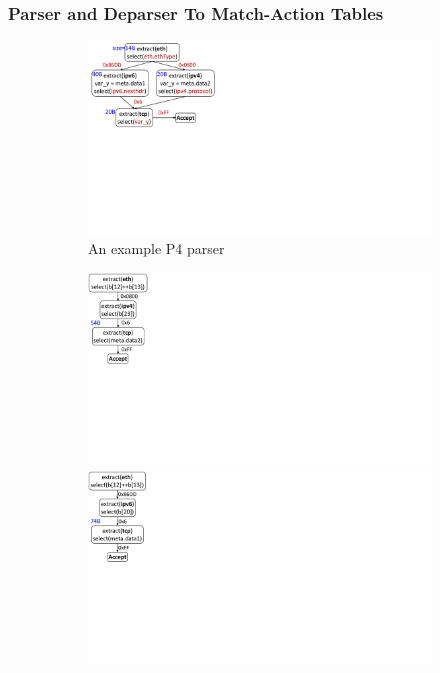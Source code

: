 \documentclass[letterpaper,twocolumn,10pt]{article}
\begin{document}
\subsubsection{Parser and Deparser To Match-Action Tables}
\label{subsection:parser-to-match-action-table}
\begin{figure}[!tb]
    \begin{subfigure}[b]{0.25\linewidth}
        \centering
        \includegraphics[trim=4 270 596 0, clip,scale=0.37]{parser-transformation-example}    
        \caption{An example P4 parser}
        \label{subfig:parser}
    \end{subfigure}
    \begin{subfigure}[b]{0.26\linewidth}
        \centering
        \includegraphics[trim=0 285 794 0, clip,scale=0.37]{parser-example-se-1}
        \includegraphics[trim=0 285 794 0, clip,scale=0.37]{parser-example-se-2}

\end{subfigure}
\end{figure}
\end{document}
